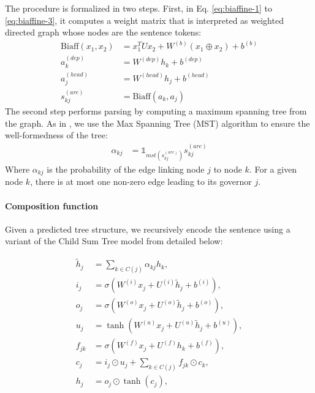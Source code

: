 The procedure is formalized in two steps. First, in Eq. \ref{eq:biaffine-1} to \ref{eq:biaffine-3},
it computes a weight matrix that is interpreted as weighted directed graph whose nodes are the sentence tokens:
\begin{align}
   \text{Biaff}(x_1,x_2) &=  x_1^T U x_2 + W^{(b)}(x_1 \oplus x_2)+b^{(b)} \\
    a_k^{(dep)} &= W^{(dep)}h_k + b^{(dep)} \label{eq:biaffine-1} \\
    a_j^{(head)} &= W^{(head)}h_j + b^{(head)} \label{eq:biaffine-2}\\
    s^{(arc)}_{kj} &= \text{Biaff}(a_k,a_j) \label{eq:biaffine-3}
\end{align}%
The second step performs parsing by computing a maximum spanning tree from the graph. As in \textcite{dozat_17}, we use the Max Spanning Tree (MST) algorithm \parencite{chu1965shortest, edmonds_67} 
to ensure the well-formedness of the tree: 
\begin{align}
 \alpha_{kj} &= \mathbb{1}_{mst(s^{(arc)}_{kj})} s^{(arc)}_{kj} \label{eq:biaffine-alpha}
\end{align}
Where $\alpha_{kj}$ is the probability of the edge linking node $j$ to node $k$. For a given node $k$, there is at most one non-zero edge leading to its governor $j$.

\paragraph{Composition function}  Given a predicted tree structure, we recursively encode the sentence using a variant of the Child Sum Tree model from \textcite{tai_15} detailed below:

\begin{align}
\tilde{h}_j &= \sum_{k \in C(j)} \alpha_{kj} h_k, \label{eq:treelstm-weighted} \\
i_j &=\sigma \left( W^{(i)} x_j + U^{(i)} \tilde{h}_j + b^{(i)} \right), \\
o_j &=\sigma \left( W^{(o)} x_j + U^{(o)} \tilde{h}_j + b^{(o)} \right), \\
u_j &=\tanh \left( W^{(u)} x_j + U^{(u)} \tilde{h}_j + b^{(u)} \right), \\
f_{jk} &= \sigma\left( W^{(f)} x_j + U^{(f)} h_k + b^{(f)} \right), \label{eq:treelstm-f}\\
c_j &= i_j \odot u_j + \sum_{k\in C(j)} f_{jk} \odot c_{k}, \\
h_j &= o_j \odot \tanh(c_j), \label{eq:treelstm-last}
\end{align}


